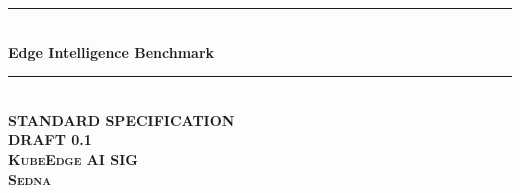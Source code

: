 \documentclass{book}
\newcommand{\HRule}{\rule{\linewidth}{0.5mm}} %
\begin{document}
\begin{titlepage}

\center %



\HRule \\[0.4cm]
{ \huge \bfseries Edge Intelligence Benchmark}\\[0.4cm] %
\HRule \\[1.5cm]

\textsc{\huge \textbf{STANDARD SPECIFICATION}}\\[1.5cm]

\textsc{\Large \textbf{DRAFT 0.1 \\[0.07cm] KubeEdge AI SIG \\[0.24cm] Sedna}}\\[1.5cm]





\end{titlepage}
\end{document}

